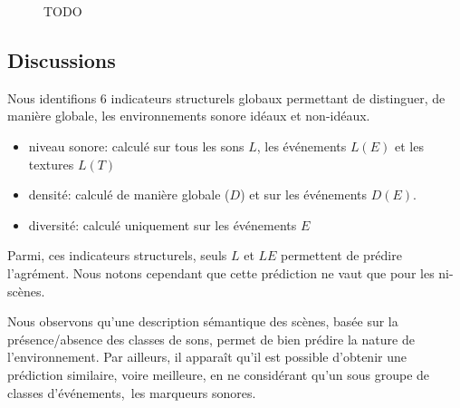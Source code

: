 \begin{figure}[t]
       \caption[TODO]{TODO}\label{fig:soundlevelMarker}
\end{figure}




\subsection{Discussions}

Nous identifions 6 indicateurs structurels globaux permettant de distinguer, de manière globale, les environnements sonore idéaux et non-idéaux.

\begin{itemize}
\item niveau sonore: calculé sur tous les sons $L$, les événements $L(E)$ et les textures $L(T)$ 
\item densité: calculé de manière globale ($D$) et sur les événements $D(E)$.
\item diversité: calculé uniquement sur les événements $E$
\end{itemize}

Parmi, ces indicateurs structurels, seuls $L$ et $LE$ permettent de prédire l'agrément. Nous notons cependant que cette prédiction ne vaut que pour les ni-scènes. 

Nous observons qu'une description sémantique des scènes, basée sur la présence/absence des classes de sons, permet de bien prédire la nature de l'environnement. Par ailleurs, il apparaît qu'il est possible d'obtenir une prédiction similaire, voire meilleure, en ne considérant qu'un sous groupe de classes d'événements,\ie~les marqueurs sonores.

